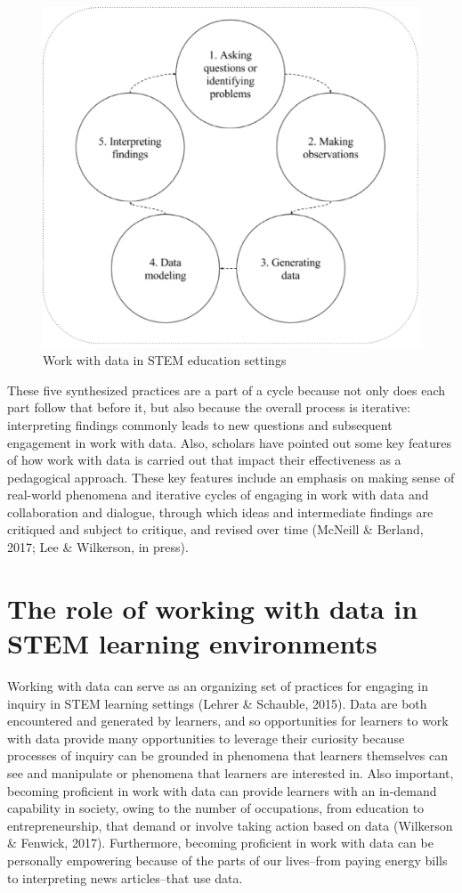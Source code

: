 \documentclass[]{msu-thesis}
\theoremstyle{definition}
\theoremstyle{definition}
\theoremstyle{definition}
\theoremstyle{remark}
\begin{document}
\begin{figure}

{\centering \includegraphics[width=0.8\linewidth]{images/figure1} 

}

\caption{Work with data in STEM education settings}\label{fig:unnamed-chunk-1}
\end{figure}

These five synthesized practices are a part of a cycle because not only
does each part follow that before it, but also because the overall
process is iterative: interpreting findings commonly leads to new
questions and subsequent engagement in work with data. Also, scholars
have pointed out some key features of how work with data is carried out
that impact their effectiveness as a pedagogical approach. These key
features include an emphasis on making sense of real-world phenomena and
iterative cycles of engaging in work with data and collaboration and
dialogue, through which ideas and intermediate findings are critiqued
and subject to critique, and revised over time (McNeill \& Berland,
2017; Lee \& Wilkerson, in press).

\section{The role of working with data in STEM learning
environments}\label{the-role-of-working-with-data-in-stem-learning-environments}

Working with data can serve as an organizing set of practices for
engaging in inquiry in STEM learning settings (Lehrer \& Schauble,
2015). Data are both encountered and generated by learners, and so
opportunities for learners to work with data provide many opportunities
to leverage their curiosity because processes of inquiry can be grounded
in phenomena that learners themselves can see and manipulate or
phenomena that learners are interested in. Also important, becoming
proficient in work with data can provide learners with an in-demand
capability in society, owing to the number of occupations, from
education to entrepreneurship, that demand or involve taking action
based on data (Wilkerson \& Fenwick, 2017). Furthermore, becoming
proficient in work with data can be personally empowering because of the
parts of our lives--from paying energy bills to interpreting news
articles--that use data.
\end{document}
